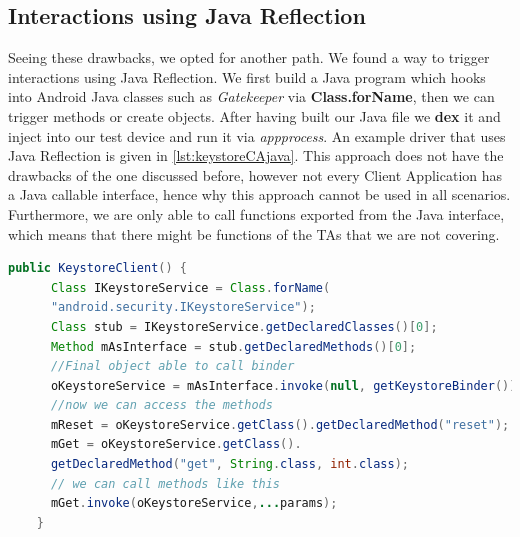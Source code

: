 \documentclass[a4paper,11pt,oneside]{article}
\begin{document}
\subsection{Interactions using Java Reflection}
\label{sub:javaref}
Seeing these drawbacks, we opted
for another path. We found a way to trigger interactions using Java
Reflection. We first build a
Java program which hooks into Android Java classes such as \emph{Gatekeeper}
via \textbf{Class.forName}, then we can trigger methods or create objects.
After having built our Java file we \textbf{dex} it and inject into our test device and
run it via \emph{app\textunderscore process}. An example driver that uses Java Reflection is given in \autoref{lst:keystoreCAjava}. This approach does not have the
drawbacks of
the one discussed before, however not every Client Application has a Java
callable interface, hence why this approach cannot be used in all scenarios. Furthermore, we are only able to call functions exported from the Java interface, which means that there might be functions of the TAs that we are not covering.
\begin{lstlisting}[label= {lst:keystoreCAjava}, language=Java, caption=Example driver for Keystore using Java Reflection]
public KeystoreClient() {
      Class IKeystoreService = Class.forName(
      "android.security.IKeystoreService");
      Class stub = IKeystoreService.getDeclaredClasses()[0];
      Method mAsInterface = stub.getDeclaredMethods()[0];
      //Final object able to call binder
      oKeystoreService = mAsInterface.invoke(null, getKeystoreBinder());
      //now we can access the methods
      mReset = oKeystoreService.getClass().getDeclaredMethod("reset");
      mGet = oKeystoreService.getClass().
      getDeclaredMethod("get", String.class, int.class);
      // we can call methods like this
      mGet.invoke(oKeystoreService,...params);
    }
\end{lstlisting}
\end{document}
